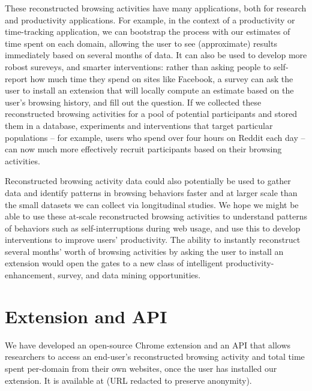 \documentclass{sigchi}
\begin{document}
These reconstructed browsing activities have many applications, both for research and productivity applications. For example, in the context of a productivity or time-tracking application, we can bootstrap the process with our estimates of time spent on each domain, allowing the user to see (approximate) results immediately based on several months of data. It can also be used to develop more robost sureveys, and smarter interventions: rather than asking people to self-report how much time they spend on sites like Facebook, a survey can ask the user to install an extension that will locally compute an estimate based on the user's browsing history, and fill out the question. If we collected these reconstructed browsing activities for a pool of potential participants and stored them in a database, experiments and interventions that target particular populations -- for example, users who spend over four hours on Reddit each day -- can now much more effectively recruit participants based on their browsing activities. %

Reconstructed browsing activity data could also potentially be used to gather data and identify patterns in browsing behaviors faster and at larger scale than the small datasets we can collect via longitudinal studies. We hope we might be able to use these at-scale reconstructed browsing activities to understand patterns of behaviors such as self-interruptions during web usage, and use this to develop interventions to improve users' productivity. The ability to instantly reconstruct several months' worth of browsing activities by asking the user to install an extension would open the gates to a new class of intelligent productivity-enhancement, survey, and data mining opportunities.

\section{Extension and API}

We have developed an open-source Chrome extension and an API that allows researchers to access an end-user's reconstructed browsing activity and total time spent per-domain from their own websites, once the user has installed our extension. It is available at (URL redacted to preserve anonymity).

%
%
%
%
%
\balance

\pagebreak




\end{document}
